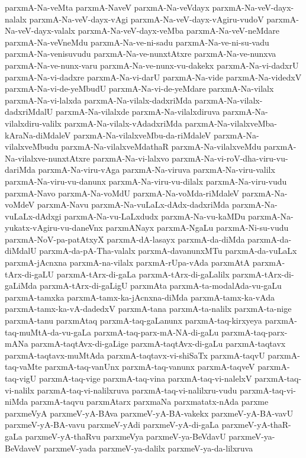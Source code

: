 {parxmA-Na-veMta
parxmA-NaveV
parxmA-Na-veVdayx
parxmA-Na-veV-dayx-nalalx
parxmA-Na-veV-dayx-vAgi
parxmA-Na-veV-dayx-vAgiru-vudoV
parxmA-Na-veV-dayx-valalx
parxmA-Na-veV-dayx-veMba
parxmA-Na-veV-neMdare
parxmA-Na-veVneMdu
parxmA-Na-ve-ni-sadu
parxmA-Na-ve-ni-su-vadu
parxmA-Na-venisuvudu
parxmA-Na-ve-nunxtAtxre
parxmA-Na-ve-nunxva
parxmA-Na-ve-nunx-varu
parxmA-Na-ve-nunx-vu-dakekx
parxmA-Na-vi-dadxrU
parxmA-Na-vi-dadxre
parxmA-Na-vi-darU
parxmA-Na-vide
parxmA-Na-videdxV
parxmA-Na-vi-de-yeMbudU
parxmA-Na-vi-de-yeMdare
parxmA-Na-vilalx
parxmA-Na-vi-lalxda
parxmA-Na-vilalx-dadxriMda
parxmA-Na-vilalx-dadxriMdalU
parxmA-Na-vilalxde
parxmA-Na-vilalxdiruva
parxmA-Na-vilalxdiru-valilx
parxmA-Na-vilalx-vAdadxriMda
parxmA-Na-vilalxveMba-kAraNa-diMdaleV
parxmA-Na-vilalxveMbu-da-riMdaleV
parxmA-Na-vilalxveMbudu
parxmA-Na-vilalxveMdathaR
parxmA-Na-vilalxveMdu
parxmA-Na-vilalxve-nunxtAtxre
parxmA-Na-vi-lalxvo
parxmA-Na-vi-roV-dha-viru-vu-dariMda
parxmA-Na-viru-vAga
parxmA-Na-viruva
parxmA-Na-viru-valilx
parxmA-Na-viru-vu-danunx
parxmA-Na-viru-vu-dilalx
parxmA-Na-viru-vudu
parxmA-Navo
parxmA-Na-voMdU
parxmA-Na-voMda-riMdaleV
parxmA-Na-voMdeV
parxmA-Navu
parxmA-Na-vuLaLx-dAdx-dadxriMda
parxmA-Na-vuLaLx-dAdxgi
parxmA-Na-vu-LaLxdudx
parxmA-Na-vu-kaMDu
parxmA-Na-yukatx-vAgiru-vu-daneVnx
parxmANayx
parxmA-NgaLu
parxmA-Ni-su-vudu
parxmA-NoV-pa-patAtxyX
parxmA-dA-lasayx
parxmA-da-diMda
parxmA-da-diMdalU
parxmA-da-pA-Tha-valalx
parxmA-davanunxMTu
parxmA-da-vuLaLx
parxmA-jAcnxna
parxmA-na-vilalx
parxmA-rUpa-vAda
parxmAtA
parxmA-tArx-di-gaLU
parxmA-tArx-di-gaLa
parxmA-tArx-di-gaLalilx
parxmA-tArx-di-gaLiMda
parxmA-tArx-di-gaLigU
parxmAta
parxmA-ta-modalAda-vu-gaLu
parxmA-tamxka
parxmA-tamx-ka-jAcnxna-diMda
parxmA-tamx-ka-vAda
parxmA-tamx-ka-vA-dadedxV
parxmA-tana
parxmA-ta-nalilx
parxmA-ta-nige
parxmA-tanu
parxmAtaq
parxmA-taq-gaLanunx
parxmA-taq-kirxyeya
parxmA-taq-muMtA-da-vu-gaLa
parxmA-taq-parx-mA-NA-di-gaLu
parxmA-taq-parx-mANa
parxmA-taqtAvx-di-gaLige
parxmA-taqtAvx-di-gaLu
parxmA-taqtavx
parxmA-taqtavx-muMtAda
parxmA-taqtavx-vi-shiSaTx
parxmA-taqvU
parxmA-taq-vaMte
parxmA-taq-vanUnx
parxmA-taq-vanunx
parxmA-taqveV
parxmA-taq-vigU
parxmA-taq-vige
parxmA-taq-vina
parxmA-taq-vi-nalelxV
parxmA-taq-vi-nalilx
parxmA-taq-vi-nalilxruva
parxmA-taq-vi-nalilxru-vudu
parxmA-taq-vi-niMda
parxmA-taqvu
parxmAtarx
parxmaNa
parxmatatx-nAda
parxme
parxmeVyA
parxmeV-yA-BAva
parxmeV-yA-BA-vakekx
parxmeV-yA-BA-vavU
parxmeV-yA-BA-vavu
parxmeV-yAdi
parxmeV-yA-di-gaLa
parxmeV-yA-thaR-gaLa
parxmeV-yA-thaRvu
parxmeVya
parxmeV-ya-BeVdavU
parxmeV-ya-BeVdaveV
parxmeV-yada
parxmeV-ya-dalilx
parxmeV-ya-da-lilxruva
}
